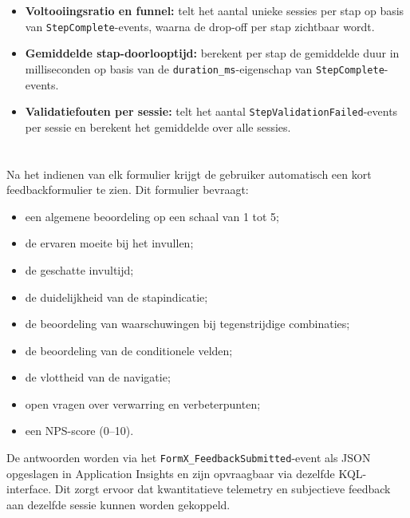 \begin{itemize}
  \item \textbf{Voltooiingsratio en funnel:} telt het aantal unieke sessies per stap op basis van \texttt{StepComplete}-events, waarna de drop-off per stap zichtbaar wordt.
  \item \textbf{Gemiddelde stap-doorlooptijd:} berekent per stap de gemiddelde duur in milliseconden op basis van de \texttt{duration\_ms}-eigenschap van \texttt{StepComplete}-events.
  \item \textbf{Validatiefouten per sessie:} telt het aantal \texttt{StepValidationFailed}-events per sessie en berekent het gemiddelde over alle sessies.
\end{itemize}

\section{}

Na het indienen van elk formulier krijgt de gebruiker automatisch een kort feedbackformulier te zien. Dit formulier bevraagt:

\begin{itemize}
  \item een algemene beoordeling op een schaal van 1 tot 5;
  \item de ervaren moeite bij het invullen;
  \item de geschatte invultijd;
  \item de duidelijkheid van de stapindicatie;
  \item de beoordeling van waarschuwingen bij tegenstrijdige combinaties;
  \item de beoordeling van de conditionele velden;
  \item de vlottheid van de navigatie;
  \item open vragen over verwarring en verbeterpunten;
  \item een NPS-score (0–10).
\end{itemize}

De antwoorden worden via het \texttt{FormX\_FeedbackSubmitted}-event als JSON opgeslagen in Application Insights en zijn opvraagbaar via dezelfde KQL-interface. Dit zorgt ervoor dat kwantitatieve telemetry en subjectieve feedback aan dezelfde sessie kunnen worden gekoppeld.

\section{}

